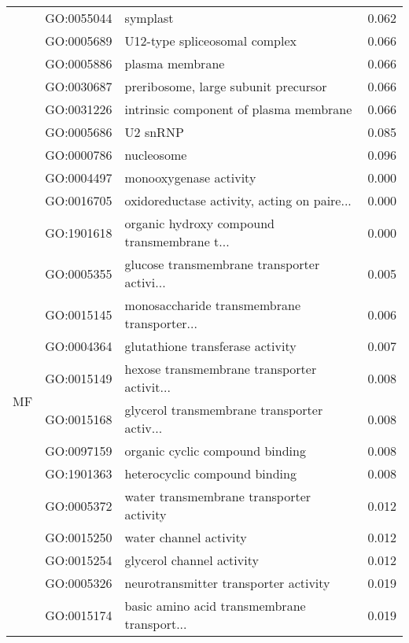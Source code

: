 \begin{longtable}{lllr}
   & GO:0055044 &                                     symplast &         0.062 \\
   & GO:0005689 &                U12-type spliceosomal complex &         0.066 \\
   & GO:0005886 &                              plasma membrane &         0.066 \\
   & GO:0030687 &         preribosome, large subunit precursor &         0.066 \\
   & GO:0031226 &       intrinsic component of plasma membrane &         0.066 \\
   & GO:0005686 &                                     U2 snRNP &         0.085 \\
   & GO:0000786 &                                   nucleosome &         0.096 \\
\cline{1-4}
\multirow{29}{*}{MF} & GO:0004497 &                       monooxygenase activity &         0.000 \\
   & GO:0016705 &  oxidoreductase activity, acting on paire... &         0.000 \\
   & GO:1901618 &  organic hydroxy compound transmembrane t... &         0.000 \\
   & GO:0005355 &  glucose transmembrane transporter activi... &         0.005 \\
   & GO:0015145 &  monosaccharide transmembrane transporter... &         0.006 \\
   & GO:0004364 &             glutathione transferase activity &         0.007 \\
   & GO:0015149 &  hexose transmembrane transporter activit... &         0.008 \\
   & GO:0015168 &  glycerol transmembrane transporter activ... &         0.008 \\
   & GO:0097159 &              organic cyclic compound binding &         0.008 \\
   & GO:1901363 &                heterocyclic compound binding &         0.008 \\
   & GO:0005372 &     water transmembrane transporter activity &         0.012 \\
   & GO:0015250 &                       water channel activity &         0.012 \\
   & GO:0015254 &                    glycerol channel activity &         0.012 \\
   & GO:0005326 &        neurotransmitter transporter activity &         0.019 \\
   & GO:0015174 &  basic amino acid transmembrane transport... &         0.019 \\

\end{longtable}
